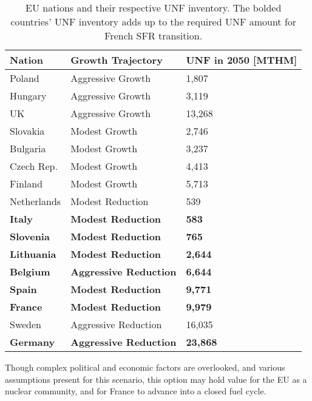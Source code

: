 \begin{table}[h]
    \centering
                \begin{tabularx}{\textwidth}{lbb}
                    \hline 
                    \textbf{Nation} & \textbf{Growth Trajectory} & \small{\textbf{UNF in 2050 [MTHM] }}\\
                    \hline
                    Poland & Aggressive Growth & 1,807\\
                    \hline
                    Hungary & Aggressive Growth & 3,119 \\ 
                    \hline
                    UK & Aggressive Growth & 13,268\\
                    \hline
                    Slovakia & Modest Growth & 2,746\\
                    \hline
                    Bulgaria & Modest Growth & 3,237 \\
                    \hline
                    Czech Rep. & Modest Growth & 4,413\\
                    \hline
                    Finland & Modest Growth &  5,713\\
                    \hline
                    Netherlands & Modest Reduction & 539\\
                    \hline
                    \textbf{Italy} & \textbf{Modest Reduction} & \textbf{583}\\
                    \hline
                    \textbf{Slovenia} & \textbf{Modest Reduction} & \textbf{765}\\
                    \hline
                    \textbf{Lithuania} & \textbf{Modest Reduction} & \textbf{2,644} \\
                    \hline
                    \textbf{Belgium} & \textbf{Aggressive Reduction} & \textbf{6,644}\\
                    \hline 
                    \textbf{Spain} & \textbf{Modest Reduction} &  \textbf{9,771} \\
                    \hline
                    \textbf{France} & \textbf{Modest Reduction} & \textbf{9,979} \\
                    \hline
                    Sweden & Aggressive Reduction & 16,035\\
                    \hline
                    \textbf{Germany} & \textbf{Aggressive Reduction} & \textbf{23,868}\\
                    \hline
                \end{tabularx}
    \caption {\gls{EU} nations and their respective \gls{UNF} inventory. The bolded countries'
              \gls{UNF} inventory adds up to the required \gls{UNF} amount for French \gls{SFR} transition. }
    \label{tab:which_send}

\end{table}

Though complex political and economic factors are overlooked,
 and various assumptions present for this scenario,
this option may hold value for the \gls{EU} as a nuclear community,
and for France to advance into a closed fuel cycle.
